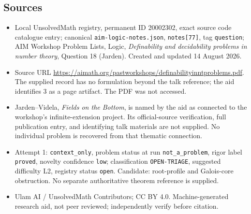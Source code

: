 \documentclass[11pt]{article}
\begin{document}
\subsection{Sources}
\begin{itemize}
\item Local UnsolvedMath registry, permanent ID 20002302, exact source code catalogue entry; canonical \texttt{aim-logic-notes.json}, \texttt{notes[77]}, tag \texttt{question}; AIM Workshop Problem Lists, Logic, \emph{Definability and decidability problems in number theory}, Question 18 (Jarden). Created and updated 14 August 2026.
\item Source URL \url{https://aimath.org/pastworkshops/definabilityinntproblems.pdf}. The supplied record has no formulation beyond the talk reference; the aid identifies 3 as a page artifact. The PDF was not accessed.
\item Jarden--Videla, \emph{Fields on the Bottom}, is named by the aid as connected to the workshop's infinite-extension project. Its official-source verification, full publication entry, and identifying talk materials are not supplied. No individual problem is recovered from that thematic connection.
\item Attempt 1: \texttt{context\_only}, problem status at run \texttt{not\_a\_problem}, rigor label \texttt{proved}, novelty confidence \texttt{low}; classification \texttt{OPEN-TRIAGE}, suggested difficulty L2, registry status \texttt{open}. Candidate: root-profile and Galois-core obstruction. No separate authoritative theorem reference is supplied.
\item Ulam AI / UnsolvedMath Contributors; CC BY 4.0. Machine-generated research aid, not peer reviewed; independently verify before citation.
\end{itemize}
\end{document}
